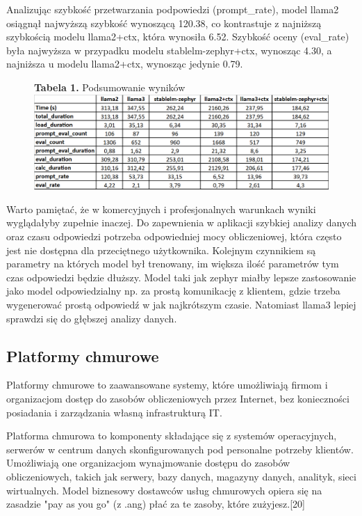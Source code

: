 Analizując szybkość przetwarzania podpowiedzi (prompt\_rate), model llama2 osiągnął najwyższą szybkość wynoszącą 120.38, co kontrastuje z najniższą szybkością modelu llama2+ctx, która wynosiła 6.52. Szybkość oceny (eval\_rate) była najwyższa w przypadku modelu stablelm-zephyr+ctx, wynosząc 4.30, a najniższa u modelu llama2+ctx, wynosząc jedynie 0.79.

\begin{figure}[H]
    \centering
    \textbf{Tabela 1.} Podsumowanie wyników \\[4ex]
    \includegraphics[width=1\textwidth]{Obrazy/benchmark_excel.png}
\end{figure}

Warto pamiętać, że w komercyjnych i profesjonalnych warunkach wyniki wyglądałyby zupełnie inaczej. Do zapewnienia w aplikacji szybkiej analizy danych oraz czasu odpowiedzi potrzeba odpowiedniej mocy obliczeniowej, która często jest nie dostępna dla przeciętnego użytkownika. Kolejnym czynnikiem są parametry na których model był trenowany, im większa ilość parametrów tym czas odpowiedzi będzie dłuższy. Model taki jak zephyr miałby lepsze zastosowanie jako model odpowiedzialny np. za prostą komunikację z klientem, gdzie trzeba wygenerować prostą odpowiedź w jak najkrótszym czasie. Natomiast llama3 lepiej sprawdzi się do głębszej analizy danych.

\subsection{Platformy chmurowe}
Platformy chmurowe to zaawansowane systemy, które umożliwiają firmom i organizacjom dostęp do zasobów obliczeniowych przez Internet, bez konieczności posiadania i zarządzania własną infrastrukturą IT.

Platforma chmurowa to komponenty składające się z systemów operacyjnych, serwerów w centrum danych skonfigurowanych pod personalne potrzeby klientów. Umożliwiają one organizacjom wynajmowanie dostępu do zasobów obliczeniowych, takich jak serwery, bazy danych, magazyny danych, analityk, sieci wirtualnych. Model biznesowy dostawców usług chmurowych opiera się na zasadzie "pay as you go" (z .ang) płać za te zasoby, które zużyjesz.[20]

